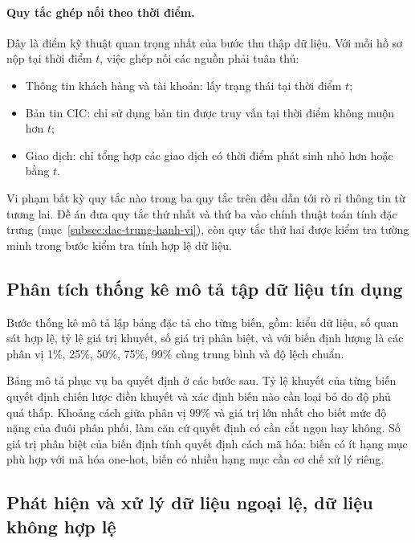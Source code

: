 \paragraph{Quy tắc ghép nối theo thời điểm.} Đây là điểm kỹ thuật quan trọng nhất
của bước thu thập dữ liệu. Với mỗi hồ sơ nộp tại thời điểm $t$, việc ghép nối các
nguồn phải tuân thủ:

\begin{itemize}
  \item Thông tin khách hàng và tài khoản: lấy trạng thái tại thời điểm $t$;
  \item Bản tin CIC: chỉ sử dụng bản tin được truy vấn tại thời điểm không muộn
  hơn $t$;
  \item Giao dịch: chỉ tổng hợp các giao dịch có thời điểm phát sinh nhỏ hơn hoặc
  bằng $t$.
\end{itemize}

Vi phạm bất kỳ quy tắc nào trong ba quy tắc trên đều dẫn tới rò rỉ thông tin từ
tương lai. Đề án đưa quy tắc thứ nhất và thứ ba vào chính thuật toán tính đặc
trưng (mục~\ref{subsec:dac-trung-hanh-vi}), còn quy tắc thứ hai được kiểm tra
tường minh trong bước kiểm tra tính hợp lệ dữ liệu.

\subsection{Phân tích thống kê mô tả tập dữ liệu tín dụng}
\label{subsec:thong-ke-mo-ta}

Bước thống kê mô tả lập bảng đặc tả cho từng biến, gồm: kiểu dữ liệu, số quan sát
hợp lệ, tỷ lệ giá trị khuyết, số giá trị phân biệt, và với biến định lượng là các
phân vị 1\%, 25\%, 50\%, 75\%, 99\% cùng trung bình và độ lệch chuẩn.

Bảng mô tả phục vụ ba quyết định ở các bước sau. Tỷ lệ khuyết của từng biến quyết
định chiến lược điền khuyết và xác định biến nào cần loại bỏ do độ phủ quá thấp.
Khoảng cách giữa phân vị 99\% và giá trị lớn nhất cho biết mức độ nặng của đuôi
phân phối, làm căn cứ quyết định có cần cắt ngọn hay không. Số giá trị phân biệt
của biến định tính quyết định cách mã hóa: biến có ít hạng mục phù hợp với mã hóa
one-hot, biến có nhiều hạng mục cần cơ chế xử lý riêng.

\subsection{Phát hiện và xử lý dữ liệu ngoại lệ, dữ liệu không hợp lệ}
\label{subsec:du-lieu-khong-hop-le}

